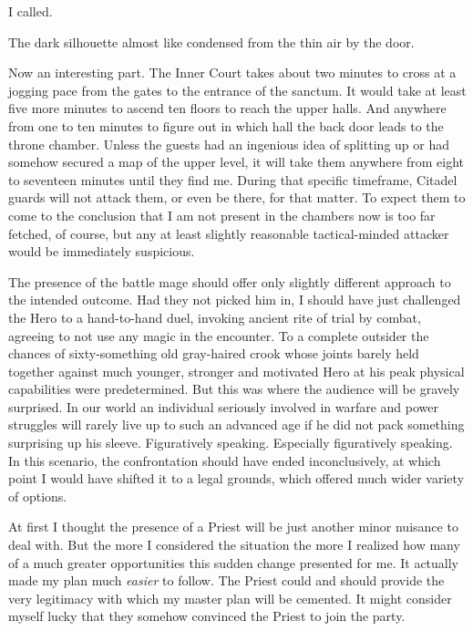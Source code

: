  I called.

 The dark silhouette almost like condensed from the thin air by the door.



Now an interesting part. The Inner Court takes about two minutes to cross at a jogging pace from the gates to the entrance of the sanctum. It would take at least five more minutes to ascend ten floors to reach the upper halls. And anywhere from one to ten minutes to figure out in which hall the back door leads to the throne chamber. Unless the guests had an ingenious idea of splitting up or had somehow secured a map of the upper level, it will take them anywhere from eight to seventeen minutes until they find me. During that specific timeframe, Citadel guards will not attack them, or even be there, for that matter. To expect them to come to the conclusion that I am not present in the chambers now is too far fetched, of course, but any at least slightly reasonable tactical-minded attacker would be immediately suspicious.

The presence of the battle mage should offer only slightly different approach to the intended outcome. Had they not picked him in, I should have just challenged the Hero to a hand-to-hand duel, invoking ancient rite of trial by combat, agreeing to not use any magic in the encounter. To a complete outsider the chances of sixty-something old gray-haired crook whose joints barely held together against much younger, stronger and motivated Hero at his peak physical capabilities were predetermined. But this was where the audience will be gravely surprised. In our world an individual seriously involved in warfare and power struggles will rarely live up to such an advanced age if he did not pack something surprising up his sleeve. Figuratively speaking. Especially figuratively speaking. In this scenario, the confrontation should have ended inconclusively, at which point I would have shifted it to a legal grounds, which offered much wider variety of options.

 At first I thought the presence of a Priest will be just another minor nuisance to deal with. But the more I considered the situation the more I realized how many of a much greater opportunities this sudden change presented for me. It actually made my plan much \textit{easier} to follow. The Priest could and should provide the very legitimacy with which my master plan will be cemented. It might consider myself lucky that they somehow convinced the Priest to join the party.

